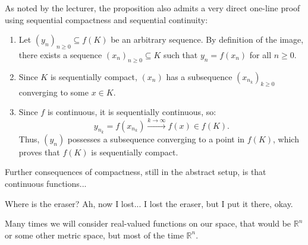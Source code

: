 \begin{content}
\begin{center}
\end{center}

\begin{steps}
As noted by the lecturer, the proposition also admits a very direct one-line proof using sequential compactness and sequential continuity:
\begin{enumerate}[label=\textbf{(\arabic*)}]
    \item Let $(y_n)_{n \ge 0} \subseteq f(K)$ be an arbitrary sequence. By definition of the image, there exists a sequence $(x_n)_{n \ge 0} \subseteq K$ such that $y_n = f(x_n)$ for all $n \ge 0$.
    \item Since $K$ is sequentially compact, $(x_n)$ has a subsequence $(x_{n_k})_{k \ge 0}$ converging to some $x \in K$.
    \item Since $f$ is continuous, it is sequentially continuous, so:
    \[
    y_{n_k} = f(x_{n_k}) \xrightarrow{k \to \infty} f(x) \in f(K).
    \]
    Thus, $(y_n)$ possesses a subsequence converging to a point in $f(K)$, which proves that $f(K)$ is sequentially compact.
\end{enumerate}
\end{steps}
\end{content}

\begin{hidden}
\end{hidden}

\begin{speech}[00:34:26 - 00:35:43]
Further consequences of compactness, still in the abstract setup, is that continuous functions...

Where is the eraser? Ah, now I lost...  I lost the eraser, but I put it there, okay.

Many times we will consider real-valued functions on our space, that would be $\mathbb{R}^n$ or some other metric space, but most of the time $\mathbb{R}^n$.
\end{speech}


